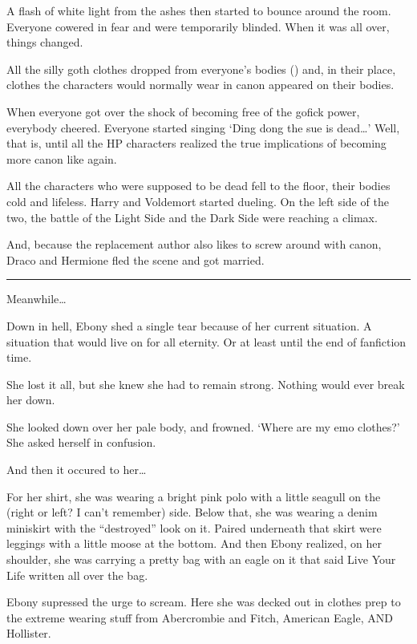 A flash of white light from the ashes then started to bounce around the room. Everyone cowered in fear and were temporarily blinded. When it was all over, things changed.

All the silly goth clothes dropped from everyone's bodies () and, in their place, clothes the characters would normally wear in canon appeared on their bodies.

\begin{sloppypar}
    When everyone got over the shock of becoming free of the gofick power, everybody cheered. Everyone started singing \enquote*{Ding dong the sue is dead\ldots} Well, that is, until all the HP characters realized the true implications of becoming more canon like again.
\end{sloppypar}

All the characters who were supposed to be dead fell to the floor, their bodies cold and lifeless. Harry and Voldemort started dueling. On the left side of the two, the battle of the Light Side and the Dark Side were reaching a climax.

And, because the replacement author also likes to screw around with canon, Draco and Hermione fled the scene and got married.

\rule{1in}{0.4pt}

Meanwhile\ldots

Down in hell, Ebony shed a single tear because of her current situation. A situation that would live on for all eternity. Or at least until the end of fanfiction time.

She lost it all, but she knew she had to remain strong. Nothing would ever break her down.

She looked down over her pale body, and frowned. \enquote*{Where are my emo clothes?} She asked herself in confusion.

And then it occured to her\ldots

For her shirt, she was wearing a bright pink polo with a little seagull on the (right or left? I can't remember) side. Below that, she was wearing a denim miniskirt with the \enquote{destroyed} look on it. Paired underneath that skirt were leggings with a little moose at the bottom. And then Ebony realized, on her shoulder, she was carrying a pretty bag with an eagle on it that said Live Your Life written all over the bag.

Ebony supressed the urge to scream. Here she was decked out in clothes prep to the extreme wearing stuff from Abercrombie and Fitch, American Eagle, AND Hollister.

